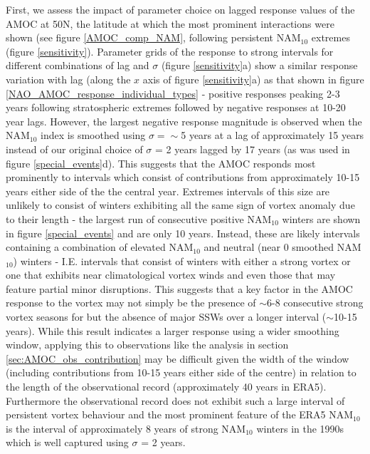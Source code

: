 First, we assess the impact of parameter choice on lagged response values of the AMOC at 50N, the latitude at which the most prominent interactions were shown (see figure \ref{AMOC_comp_NAM}, following persistent NAM$_{10}$ extremes (figure \ref{sensitivity}). Parameter grids of the response to strong intervals for different combinations of lag and $\sigma$ (figure \ref{sensitivity}a) show a similar response variation with lag (along the $x$ axis of figure \ref{sensitivity}a) as that shown in figure \ref{NAO_AMOC_response_individual_types} - positive responses peaking 2-3 years following stratospheric extremes followed by negative responses at 10-20 year lags. However, the largest negative response magnitude is observed when the NAM$_{10}$ index is smoothed using $\sigma = \sim$5 years at a lag of approximately 15 years instead of our original choice of $\sigma$ = 2 years lagged by 17 years (as was used in figure \ref{special_events}d). This suggests that the AMOC responds most prominently to intervals which consist of contributions from approximately 10-15 years either side of the the central year. Extremes intervals of this size are unlikely to consist of winters exhibiting all the same sign of vortex anomaly due to their length - the largest run of consecutive positive NAM$_{10}$ winters are shown in figure \ref{special_events} and are only 10 years. Instead, these are likely intervals containing a combination of elevated NAM$_{10}$ and neutral (near 0 smoothed NAM$_{10}$) winters - I.E. intervals that consist of winters with either a strong vortex or one that exhibits near climatological vortex winds and even those that may feature partial minor disruptions. This suggests that a key factor in the AMOC response to the vortex may not simply be the presence of $\sim$6-8 consecutive strong vortex seasons for but the absence of major SSWs over a longer interval ($\sim$10-15 years). While this result indicates a larger response using a wider smoothing window, applying this to observations like the analysis in section \ref{sec:AMOC_obs_contribution} may be difficult given the width of the window (including contributions from 10-15 years either side of the centre) in relation to the length of the observational record (approximately 40 years in ERA5). Furthermore the observational record does not exhibit such a large interval of persistent vortex behaviour and the most prominent feature of the ERA5 NAM$_{10}$ is the interval of approximately 8 years of strong NAM$_{10}$ winters in the 1990s which is well captured using $\sigma$ = 2 years. 

